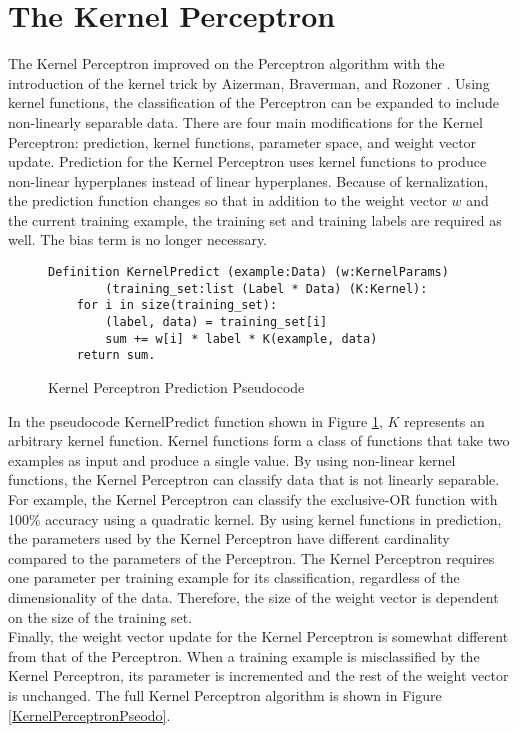 \section{The Kernel Perceptron}\label{KernelPerceptronSection}
The Kernel Perceptron improved on the Perceptron algorithm with the introduction of the kernel trick by Aizerman, Braverman, and Rozoner \cite{ABR64}. Using kernel functions, the classification of the Perceptron can be expanded to include non-linearly separable data. There are four main modifications for the Kernel Perceptron: prediction, kernel functions, parameter space, and weight vector update. Prediction for the Kernel Perceptron uses kernel functions to produce non-linear hyperplanes instead of linear hyperplanes. Because of kernalization, the prediction function changes so that in addition to the weight vector $w$ and the current training example, the training set and training labels are required as well. The bias term is no longer necessary.

\begin{figure}
    \caption{Kernel Perceptron Prediction Pseudocode}
    \label{KernelPerceptronPredictPseudo}
    \begin{lstlisting}
Definition KernelPredict (example:Data) (w:KernelParams) 
        (training_set:list (Label * Data) (K:Kernel):
    for i in size(training_set):
        (label, data) = training_set[i]
        sum += w[i] * label * K(example, data)
    return sum.
    \end{lstlisting}
\end{figure}

In the pseudocode KernelPredict function shown in Figure \ref{KernelPerceptronPredictPseudo}, $K$ represents an arbitrary kernel function. Kernel functions form a class of functions that take two examples as input and produce a single value. By using non-linear kernel functions, the Kernel Perceptron can classify data that is not linearly separable. For example, the Kernel Perceptron can classify the exclusive-OR function with 100\% accuracy
using a quadratic kernel. By using kernel functions in prediction, the parameters used by the Kernel Perceptron have different cardinality compared to the parameters of the Perceptron. The Kernel Perceptron requires one parameter per training example for its classification, regardless of the dimensionality of the data. Therefore, the size of the weight vector is dependent on the size of the training set. 
\\Finally, the weight vector update for the Kernel Perceptron is somewhat different from that of the Perceptron. When a training example is misclassified by the Kernel Perceptron, its parameter is incremented and the rest of the weight vector is unchanged. The full Kernel Perceptron algorithm is shown in Figure \ref{KernelPerceptronPseodo}.

